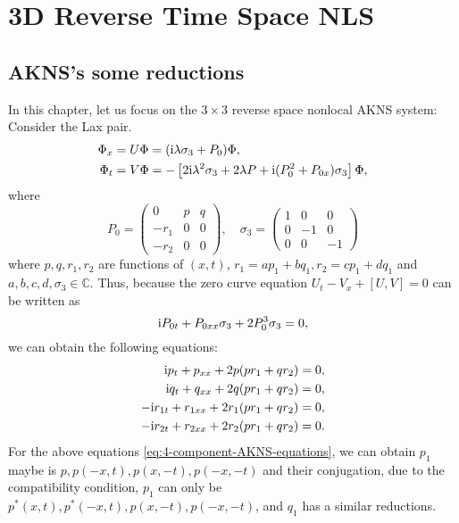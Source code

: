 \chapter{3D Reverse Time Space NLS}
\section{AKNS's some reductions}
In this chapter, let us focus on the $ 3 \times 3 $ reverse space nonlocal AKNS system: Consider the Lax pair. 
\begin{equation}
    \begin{aligned}
        \Phi_{x} &= U \Phi = (\mathrm{i} \lambda \sigma_{3} + P_{0})\Phi, \\
        \Phi_{t} &= V \Phi = - \left[2 \mathrm{i} \lambda^{2} \sigma_{3}+ 2\lambda P + \mathrm{i}(P_{0}^{2} + P_{0x})\sigma_{3} \right]\Phi, 
    \end{aligned}\label{eq:Sis-Lax-Pair}
\end{equation}
where 
\begin{equation}
    P_{0} = \begin{pmatrix}
        0 & p & q \\
        -r_{1} & 0 & 0 \\
        -r_{2} & 0 & 0
    \end{pmatrix}, \quad \sigma_{3} = \begin{pmatrix}
        1 & 0 & 0 \\
        0 & -1 & 0 \\
        0 & 0 & -1
    \end{pmatrix}
\end{equation}
where $ p, q, r_{1}, r_{2} $ are functions of $ (x,t) $, $ r_{1} = ap_{1} + bq_{1}, r_{2} = cp_{1} + dq_{1}$ and $ a, b, c, d, \sigma_{3} \in \mathbb{C} $. Thus, because the zero curve equation $ U_{t} - V_{x} +[U,V] = 0 $ can be written as
\begin{equation}
    \mathrm{i} P_{0t} + P_{0xx}\sigma_{3} + 2P_{0}^{3}\sigma_{3} = 0, \label{eq:3d-NLS-zero-curve-equation}
\end{equation}
we can obtain the following equations:
\begin{subequations}
    \begin{align}
        \mathrm{i} p_{t} + p_{xx} + 2p(pr_{1} + qr_{2}) &= 0, \\
        \mathrm{i} q_{t} + q_{xx} + 2q(pr_{1} + qr_{2}) &= 0, \\
        -\mathrm{i} r_{1t} + r_{1xx} + 2r_{1}(pr_{1} + qr_{2}) &= 0, \\
        -\mathrm{i} r_{2t} + r_{2xx} + 2r_{2}(pr_{1} + qr_{2}) &= 0.
    \end{align} \label{eq:4-component-AKNS-equations}
\end{subequations}
For the above equations \eqref{eq:4-component-AKNS-equations}, we can obtain $ p_{1} $ maybe is $ p, p(-x,t), p(x,-t), p(-x,-t) $ and their conjugation, due to the compatibility condition, $p_1$ can only be $ p^{*}(x,t), p^{*}(-x,t), p(x,-t), p(-x,-t) $, and $ q_1 $ has a similar reductions.


